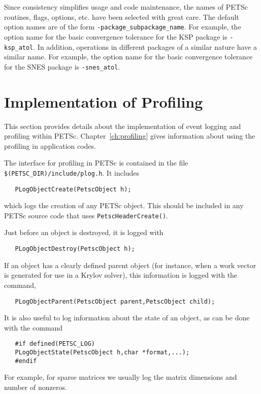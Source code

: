 Since consistency simplifies usage and code maintenance, the names of
PETSc routines, flags, options, etc. have been selected with great care.
The default option names are of the form {\tt -package\_subpackage\_name}.  
For example, the option name for the basic convergence tolerance for 
the KSP package is {\tt -ksp\_atol}. In addition, operations in different 
packages of a similar nature have a similar name.  For example, the option
name for the basic convergence tolerance for the SNES package is 
{\tt -snes\_atol}.

\section{Implementation of Profiling}
\label{sec:profimpl}

This section provides details about the implementation of event
logging and profiling within PETSc.   Chapter~\ref{ch:profiling}
gives information about using the profiling in application codes. 

The interface for profiling in PETSc is contained in the file 
{\tt \$(PETSC\_DIR)/include/plog.h}. It includes 
\begin{verbatim}
   PLogObjectCreate(PetscObject h);
\end{verbatim}
which logs the creation of any PETSc object. This should be included in 
any PETSc source code that uses {\tt PetscHeaderCreate()}. 

Just before an object is destroyed, it is logged
with  
\begin{verbatim}
   PLogObjectDestroy(PetscObject h);
\end{verbatim}

If an object has a clearly defined parent object (for instance, when 
a work vector is generated for use in a Krylov solver), this information
is logged with the command, 
\begin{verbatim}
   PLogObjectParent(PetscObject parent,PetscObject child);
\end{verbatim}
It is also useful to log information about the state of an object, as can
be done with the command 
\begin{verbatim}
   #if defined(PETSC_LOG)
   PLogObjectState(PetscObject h,char *format,...);
   #endif
\end{verbatim}
For example, for sparse matrices we usually log the matrix 
dimensions and number of nonzeros.

